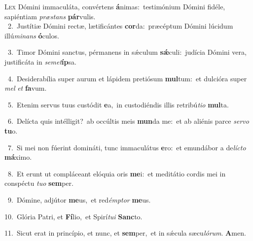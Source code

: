 \lettrine{\initial\textcolor{\initialcolor}{L}}{ex} Dómini immaculáta, convértens \textbf{á}\-nimas:~\star testimónium Dómini fidéle, sapiéntiam \textit{præ}\-\textit{stans} \textbf{pár}\-vulis.\\
{\numbfont\textcolor{\numbcolor}{~2.}}~Justítiæ Dómini rectæ, lætificántes \textbf{cor}\-da:~\star præcéptum Dómini lúcidum illú\-\textit{mi}\-\textit{nans} \textbf{ó}\-culos.\par
{\numbfont\textcolor{\numbcolor}{~3.}}~Timor Dómini sanctus, pérmanens in sǽculum \textbf{sǽ}\-culi:~\star judícia Dómini vera, justificáta in \textit{se}\-\textit{met}\textbf{íp}sa.\par
{\numbfont\textcolor{\numbcolor}{~4.}}~Desiderabília super aurum et lápidem pretiósum \textbf{mul}\-tum:~\star et dulcióra super \textit{mel} \textit{et} \textbf{fa}\-vum.\par
{\numbfont\textcolor{\numbcolor}{~5.}}~Etenim servus tuus custódit \textbf{e}\-a,~\star in custodiéndis illis retribú\-\textit{ti}\-\textit{o} \textbf{mul}\-ta.\par
{\numbfont\textcolor{\numbcolor}{~6.}}~Delícta quis intélligit?~\dagger ab occúltis meis \textbf{mun}\-da me:~\star et ab aliénis parce \textit{ser}\-\textit{vo} \textbf{tu}\-o.\par
{\numbfont\textcolor{\numbcolor}{~7.}}~Si mei non fúerint domináti, tunc immaculátus \textbf{e}\-ro:~\star et emundábor a de\-\textit{líc}\-\textit{to} \textbf{má}\-ximo.\par
{\numbfont\textcolor{\numbcolor}{~8.}}~Et erunt ut compláceant elóquia oris \textbf{me}\-i:~\star et meditátio cordis mei in conspéctu \textit{tu}\-\textit{o} \textbf{sem}\-per.\par
{\numbfont\textcolor{\numbcolor}{~9.}}~Dómine, adjútor \textbf{me}\-us,~\star et red\-\textit{émp}\-\textit{tor} \textbf{me}\-us.\par
{\numbfont\textcolor{\numbcolor}{10.}}~Glória Patri, et \textbf{Fí}\-lio,~\star et Spirí\-\textit{tu}\-\textit{i} \textbf{Sanc}\-to.\par
{\numbfont\textcolor{\numbcolor}{11.}}~Sicut erat in princípio, et nunc, et \textbf{sem}\-per,~\star et in sǽcula sæcu\-\textit{ló}\-\textit{rum}. \textbf{A}\-men.\par
